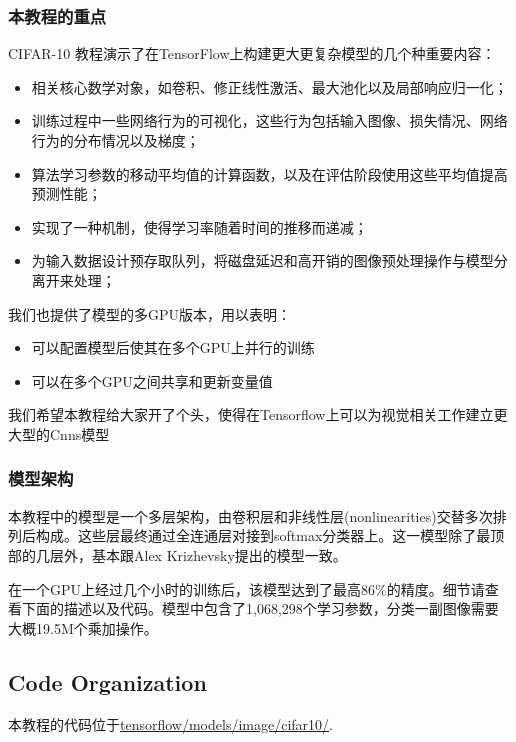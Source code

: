 \subsubsection {本教程的重点}
CIFAR-10 教程演示了在TensorFlow上构建更大更复杂模型的几个种重要内容：

\begin{itemize}
\item 相关核心数学对象，如卷积、修正线性激活、最大池化以及局部响应归一化；
\item 训练过程中一些网络行为的可视化，这些行为包括输入图像、损失情况、网络行为的分布情况以及梯度；
\item 算法学习参数的移动平均值的计算函数，以及在评估阶段使用这些平均值提高预测性能；
\item 实现了一种机制，使得学习率随着时间的推移而递减；
\item 为输入数据设计预存取队列，将磁盘延迟和高开销的图像预处理操作与模型分离开来处理；
\end{itemize}

我们也提供了模型的多GPU版本，用以表明：

\begin{itemize}
\item 可以配置模型后使其在多个GPU上并行的训练
\item 可以在多个GPU之间共享和更新变量值
\end{itemize}

我们希望本教程给大家开了个头，使得在Tensorflow上可以为视觉相关工作建立更大型的Cnns模型

\subsubsection {模型架构}

本教程中的模型是一个多层架构，由卷积层和非线性层(nonlinearities)交替多次排列后构成。这些层最终通过全连通层对接到softmax分类器上。这一模型除了最顶部的几层外，基本跟Alex Krizhevsky提出的模型一致。

在一个GPU上经过几个小时的训练后，该模型达到了最高86\%的精度。细节请查看下面的描述以及代码。模型中包含了1,068,298个学习参数，分类一副图像需要大概19.5M个乘加操作。

\subsection {Code Organization}

本教程的代码位于\href{https://tensorflow.googlesource.com/tensorflow/+/master/tensorflow/models/image/cifar10/}{tensorflow/models/image/cifar10/}.

